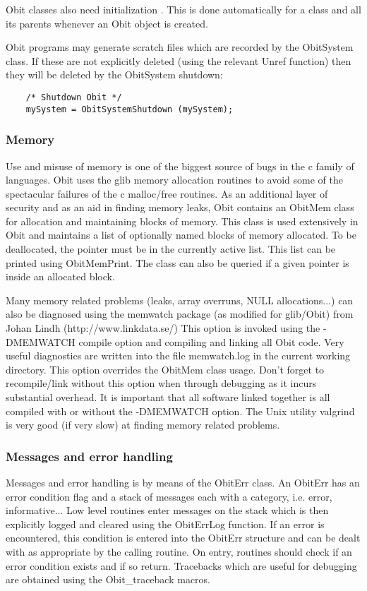 \documentclass[11pt]{article}
\begin{document}
   Obit classes also need initialization .
This is done automatically for a class and all its parents whenever
an Obit object is created.

Obit programs may generate scratch files which are recorded by the
ObitSystem class.
If these are not explicitly deleted (using the relevant Unref
function) then they will be deleted by the ObitSystem shutdown:
\begin{verbatim}
    /* Shutdown Obit */
    mySystem = ObitSystemShutdown (mySystem);
\end{verbatim}

\subsubsection{Memory}
Use and misuse of memory is one of the biggest source of bugs in the c
family of languages.
Obit uses the glib memory allocation routines to avoid some of the
spectacular failures of the c malloc/free routines.
As an additional layer of security and as an aid in finding memory
leaks, Obit contains an ObitMem class for allocation and maintaining
blocks of memory.
This class is used extensively in Obit and maintains a list of
optionally named blocks of memory allocated.
To be deallocated, the pointer must be in the currently active list.
This list can be printed using ObitMemPrint.
The class can also be queried if a given pointer is inside an
allocated block.

   Many memory related problems (leaks, array overruns, NULL
allocations...) can also be diagnosed using the memwatch package (as
modified for glib/Obit) from Johan Lindh (http://www.linkdata.se/)
This option is invoked using the -DMEMWATCH compile option and
compiling and linking all Obit code.  Very useful diagnostics are
written into the file memwatch.log in the current working directory.
This option overrides the ObitMem class usage.
Don't forget to recompile/link without this option when through
debugging as it incurs substantial overhead.
It is important that all software linked together is all compiled
with or without the -DMEMWATCH option.
The Unix utility valgrind is very good (if very slow) at finding
memory related problems.

\subsubsection{Messages and error handling}
Messages and error handling is by means of the ObitErr class.
An ObitErr has an error condition flag and a stack of messages each
with a category, i.e. error, informative...
Low level routines enter messages on the stack which is then
explicitly logged and cleared using the ObitErrLog function.
If an error is encountered, this condition is entered into the ObitErr
structure and can be dealt with as appropriate by the calling
routine.
On entry, routines should check if an error condition exists and if so
return.
Tracebacks which are useful for debugging are obtained using the
Obit\_traceback macros.
\end{document}
